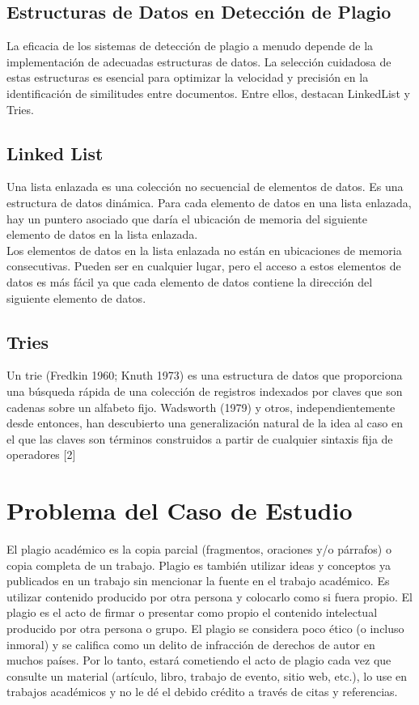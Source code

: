 \documentclass[a4paper]{article}
\begin{document}
\begin{multicols}{2}
\subsection{Estructuras de Datos en Detección de Plagio}
La eficacia de los sistemas de detección de plagio a menudo depende de la implementación de adecuadas estructuras de datos. La selección cuidadosa de estas estructuras es esencial para optimizar la velocidad y precisión en la identificación de similitudes entre documentos.
Entre ellos, destacan LinkedList y Tries.


\subsection{Linked List}
Una lista enlazada es una colección no secuencial de elementos de datos. Es una estructura de datos dinámica.
Para cada elemento de datos en una lista enlazada, hay un puntero asociado que daría el ubicación de memoria del siguiente elemento de datos en la lista enlazada.\\
Los elementos de datos en la lista enlazada no están en ubicaciones de memoria consecutivas. Pueden ser en cualquier lugar, pero el acceso a estos elementos de datos es más fácil ya que cada elemento de datos contiene
la dirección del siguiente elemento de datos.

\subsection{Tries}
Un trie (Fredkin 1960; Knuth 1973) es una estructura de datos que proporciona una búsqueda rápida de una colección de registros indexados por claves que son cadenas sobre un alfabeto fijo. Wadsworth (1979)
y otros, independientemente desde entonces, han descubierto una generalización natural de la idea
al caso en el que las claves son términos construidos a partir de cualquier sintaxis fija de operadores [2]


\section{Problema del Caso de Estudio}
El plagio académico es la copia parcial (fragmentos, oraciones y/o párrafos) o copia completa de un trabajo. Plagio es también utilizar ideas y conceptos ya publicados en un trabajo sin mencionar la fuente en el trabajo académico. Es utilizar contenido producido por otra persona y colocarlo como si fuera propio.
El plagio es el acto de firmar o presentar como propio el contenido intelectual producido por otra persona o grupo. El plagio se considera poco ético (o incluso inmoral) y se califica como un delito de infracción de derechos de autor en muchos países. Por lo tanto, estará cometiendo el acto de plagio cada vez que consulte un material (artículo, libro, trabajo de evento, sitio web, etc.), lo use en trabajos académicos y no le dé el debido crédito a través de citas y referencias.


\end{multicols}
\end{document}
